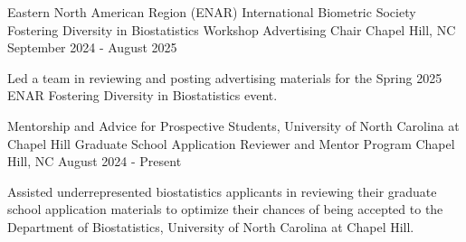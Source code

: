 

\begin{cventries}

  \cventry
    {Eastern North American Region (ENAR) International Biometric Society} %
    {Fostering Diversity in Biostatistics Workshop Advertising Chair} %
    {Chapel Hill, NC} %
    {September 2024 - August 2025} %
    {
      \begin{cvitems} 
        \item Led a team in reviewing and posting advertising materials for the Spring 2025 ENAR Fostering Diversity in Biostatistics event.
      \end{cvitems}
    }
    
  \cventry
    {Mentorship and Advice for Prospective Students, University of North Carolina at Chapel Hill} %
    {Graduate School Application Reviewer and Mentor Program} %
    {Chapel Hill, NC} %
    {August 2024 - Present} %
    {
      \begin{cvitems} %
        \item Assisted underrepresented biostatistics applicants in reviewing their graduate school application materials to \newline optimize their chances of being accepted to the Department of Biostatistics, University of North Carolina at Chapel Hill.
      \end{cvitems}
    }
    


\end{cventries}
